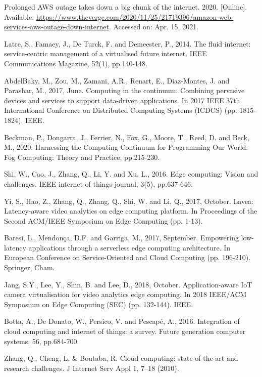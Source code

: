 \documentclass{ieeeaccess}
\begin{document}
\begin{thebibliography}{00}
 Prolonged AWS outage takes down a big chunk of the internet. 2020. [Online]. Available: \url{https://www.theverge.com/2020/11/25/21719396/amazon-web-services-aws-outage-down-internet}. Accessed on: Apr. 15, 2021.

 Latre, S., Famaey, J., De Turck, F. and Demeester, P., 2014. The fluid internet: service-centric management of a virtualised future internet. IEEE Communications Magazine, 52(1), pp.140-148.

 AbdelBaky, M., Zou, M., Zamani, A.R., Renart, E., Diaz-Montes, J. and Parashar, M., 2017, June. Computing in the continuum: Combining pervasive devices and services to support data-driven applications. In 2017 IEEE 37th International Conference on Distributed Computing Systems (ICDCS) (pp. 1815-1824). IEEE.

 Beckman, P., Dongarra, J., Ferrier, N., Fox, G., Moore, T., Reed, D. and Beck, M., 2020. Harnessing the Computing Continuum for Programming Our World. Fog Computing: Theory and Practice, pp.215-230.

 Shi, W., Cao, J., Zhang, Q., Li, Y. and Xu, L., 2016. Edge computing: Vision and challenges. IEEE internet of things journal, 3(5), pp.637-646.

 Yi, S., Hao, Z., Zhang, Q., Zhang, Q., Shi, W. and Li, Q., 2017, October. Lavea: Latency-aware video analytics on edge computing platform. In Proceedings of the Second ACM/IEEE Symposium on Edge Computing (pp. 1-13).

 Baresi, L., Mendonça, D.F. and Garriga, M., 2017, September. Empowering low-latency applications through a serverless edge computing architecture. In European Conference on Service-Oriented and Cloud Computing (pp. 196-210). Springer, Cham.

 Jang, S.Y., Lee, Y., Shin, B. and Lee, D., 2018, October. Application-aware IoT camera virtualisation for video analytics edge computing. In 2018 IEEE/ACM Symposium on Edge Computing (SEC) (pp. 132-144). IEEE.

 Botta, A., De Donato, W., Persico, V. and Pescapé, A., 2016. Integration of cloud computing and internet of things: a survey. Future generation computer systems, 56, pp.684-700.

 Zhang, Q., Cheng, L. \& Boutaba, R. Cloud computing: state-of-the-art and research challenges. J Internet Serv Appl 1, 7–18 (2010).


\end{thebibliography}
\end{document}
